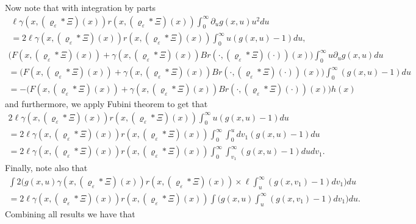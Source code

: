 \documentclass[12pt]{article}
\begin{document}
\normalsize
Now note that with integration by parts
\begin{multline}
 \ell \gamma(x, (\varrho_{\varepsilon}*\Xi)(x)) r(x, (\varrho_{\varepsilon}*\Xi)(x))  \int_{0}^{\infty}\partial_u g(x,u) u^2 du  \\=  2\ell\gamma(x, (\varrho_{\varepsilon}*\Xi)(x)) r(x, (\varrho_{\varepsilon}*\Xi)(x))\int_{0}^{\infty} u (g(x,u)-1) du, 
\end{multline}
\begin{multline}
 \big(F(x, (\varrho_{\varepsilon}*\Xi)(x))+\gamma(x, (\varrho_{\varepsilon}*\Xi)(x))Br( \cdot, (\varrho_{\varepsilon}* \Xi)(\cdot))(x)\big)\int_{0}^{\infty} u \partial_u g(x,u)du \\=\big(F(x, (\varrho_{\varepsilon}*\Xi)(x))+\gamma(x, (\varrho_{\varepsilon}*\Xi)(x))Br( \cdot, (\varrho_{\varepsilon}* \Xi)(\cdot))(x)\big)\int_{0}^{\infty} (g(x,u)-1) du\\
 =-\big(F(x, (\varrho_{\varepsilon}*\Xi)(x))+\gamma(x, (\varrho_{\varepsilon}*\Xi)(x))Br( \cdot, (\varrho_{\varepsilon}* \Xi)(\cdot))(x)\big) h(x)
\end{multline}
and furthermore, we apply Fubini theorem to get that 
\begin{multline}
  2 \ell \gamma(x, (\varrho_{\varepsilon}*\Xi)(x)) r(x, (\varrho_{\varepsilon}*\Xi)(x)) \int_{0}^{\infty} u    (g(x,u)-1) du \\
  =   2 \ell \gamma(x, (\varrho_{\varepsilon}*\Xi)(x)) r(x, (\varrho_{\varepsilon}*\Xi)(x)) \int_{0}^{\infty} \int_{0}^{u}    dv_1 (g(x,u)-1) du \\
  =  2 \ell \gamma(x, (\varrho_{\varepsilon}*\Xi)(x)) r(x, (\varrho_{\varepsilon}*\Xi)(x)) \int_{0}^{\infty}  \int_{v_1}^{\infty}    (g(x,u)-1) du dv_1.
\end{multline}
Finally, note also that
\begin{multline}
\int 2\bigg(g(x,u)\gamma(x, (\varrho_{\varepsilon}*\Xi)(x)) r(x, (\varrho_{\varepsilon}*\Xi)(x))\times \ell \int_u^{
\infty}(g(x,v_1)-1)dv_1\bigg)du\\
= 2\ell \gamma(x, (\varrho_{\varepsilon}*\Xi)(x)) r(x, (\varrho_{\varepsilon}*\Xi)(x))\int \bigg( g(x,u) \int_u^{
\infty}(g(x,v_1)-1)dv_1\bigg)du.
\end{multline}
\normalsize
Combining all results we have that
\small
\end{document}
